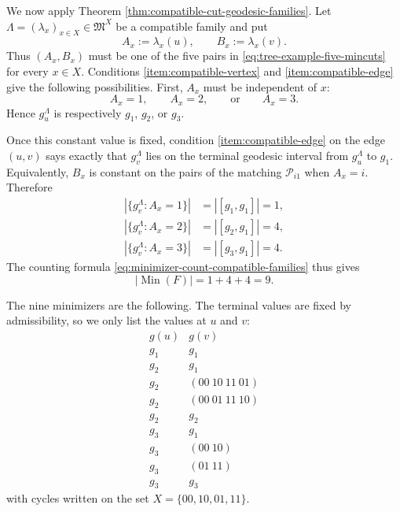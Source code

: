 \documentclass[11pt,oneside,letterpaper]{article}
\numberwithin{equation}{section}
\theoremstyle{definition}
\theoremstyle{remark}
\begin{document}
  We now apply Theorem \ref{thm:compatible-cut-geodesic-families}.  Let
  $\Lambda=(\lambda_x)_{x\in X}\in\mathfrak{M}^X$ be a compatible
  family and put
  \begin{equation}
    A_x:=\lambda_x(u),\qquad B_x:=\lambda_x(v).
  \end{equation}
  Thus $(A_x,B_x)$ must be one of the five pairs in
  \eqref{eq:tree-example-five-mincuts} for every $x\in X$.  Conditions
  \ref{item:compatible-vertex} and \ref{item:compatible-edge} give the
  following possibilities.  First, $A_x$ must be independent of $x$:
  \begin{equation}
    A_x= 1,\qquad A_x= 2,\qquad \text{or}\qquad A_x= 3.
  \end{equation}
  Hence $g_u^\Lambda$ is respectively $g_1$, $g_2$, or $g_3$.

  Once this constant value is fixed, condition
  \ref{item:compatible-edge} on the edge $(u,v)$ says exactly that
  $g_v^\Lambda$ lies on the terminal geodesic interval from
  $g_u^\Lambda$ to $g_1$.  Equivalently, $B_x$ is constant on the pairs
  of the matching $\mathcal{P}_{i1}$ when $A_x= i$.  Therefore
  \begin{align}
    |\{g_v^\Lambda:A_x= 1\}|
    &= |[g_1,g_1]|=1,\\
    |\{g_v^\Lambda:A_x= 2\}|
    &= |[g_2,g_1]|=4,\\
    |\{g_v^\Lambda:A_x= 3\}|
    &= |[g_3,g_1]|=4.
  \end{align}
  The counting formula \eqref{eq:minimizer-count-compatible-families}
  thus gives
  \begin{equation}
    |\operatorname{Min}(F)|=1+4+4=9.
  \end{equation}

  The nine minimizers are the following.  The terminal values are fixed
  by admissibility, so we only list the values at $u$ and $v$:
  \begin{equation}
  \begin{array}{c|c}
    g(u) & g(v)\\
    \hline
    g_1 & g_1\\
    g_2 & g_1\\
    g_2 & (00\ 10\ 11\ 01)\\
    g_2 & (00\ 01\ 11\ 10)\\
    g_2 & g_2\\
    g_3 & g_1\\
    g_3 & (00\ 10)\\
    g_3 & (01\ 11)\\
    g_3 & g_3
  \end{array}
  \end{equation}
  with cycles written on the set $X=\{00,10,01,11\}$.
\end{document}
